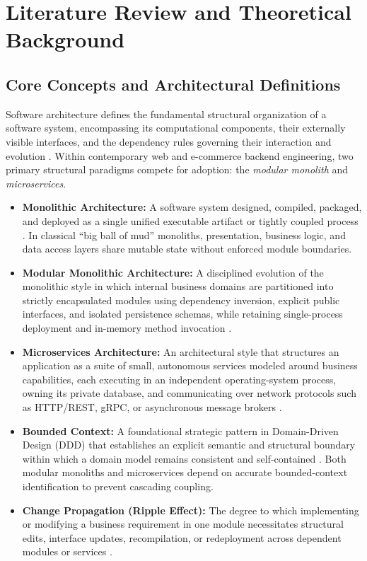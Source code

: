 \chapter{Literature Review and Theoretical Background}
\label{chap:litreview}

\section{Core Concepts and Architectural Definitions}
\label{sec:concepts}

Software architecture defines the fundamental structural organization of a software system, encompassing its computational components, their externally visible interfaces, and the dependency rules governing their interaction and evolution \cite{martin2017,ford2022}. Within contemporary web and e-commerce backend engineering, two primary structural paradigms compete for adoption: the \textit{modular monolith} and \textit{microservices}.

\begin{itemize}[leftmargin=1.5em]
  \item \textbf{Monolithic Architecture:} A software system designed, compiled, packaged, and deployed as a single unified executable artifact or tightly coupled process \cite{richardson2018}. In classical ``big ball of mud'' monoliths, presentation, business logic, and data access layers share mutable state without enforced module boundaries.
  \item \textbf{Modular Monolithic Architecture:} A disciplined evolution of the monolithic style in which internal business domains are partitioned into strictly encapsulated modules using dependency inversion, explicit public interfaces, and isolated persistence schemas, while retaining single-process deployment and in-memory method invocation \cite{martin2017,newman2021}.
  \item \textbf{Microservices Architecture:} An architectural style that structures an application as a suite of small, autonomous services modeled around business capabilities, each executing in an independent operating-system process, owning its private database, and communicating over network protocols such as HTTP/REST, gRPC, or asynchronous message brokers \cite{fowler2014,dragoni2017}.
  \item \textbf{Bounded Context:} A foundational strategic pattern in Domain-Driven Design (DDD) that establishes an explicit semantic and structural boundary within which a domain model remains consistent and self-contained \cite{evans2003}. Both modular monoliths and microservices depend on accurate bounded-context identification to prevent cascading coupling.
  \item \textbf{Change Propagation (Ripple Effect):} The degree to which implementing or modifying a business requirement in one module necessitates structural edits, interface updates, recompilation, or redeployment across dependent modules or services \cite{parnas1972,ford2022}.
\end{itemize}

